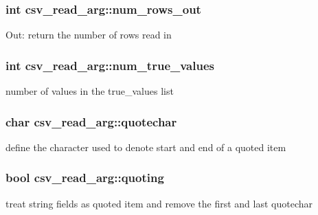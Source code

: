 \subsubsection[{\texorpdfstring{num\+\_\+rows\+\_\+out}{num_rows_out}}]{\setlength{\rightskip}{0pt plus 5cm}int csv\+\_\+read\+\_\+arg\+::num\+\_\+rows\+\_\+out}\hypertarget{structcsv__read__arg_a0ee2696a9496af7b763950450d97004c}{}\label{structcsv__read__arg_a0ee2696a9496af7b763950450d97004c}
Out\+: return the number of rows read in 
\subsubsection[{\texorpdfstring{num\+\_\+true\+\_\+values}{num_true_values}}]{\setlength{\rightskip}{0pt plus 5cm}int csv\+\_\+read\+\_\+arg\+::num\+\_\+true\+\_\+values}\hypertarget{structcsv__read__arg_addec99ef63c487be0b0cad3ea7f23c20}{}\label{structcsv__read__arg_addec99ef63c487be0b0cad3ea7f23c20}
number of values in the true\+\_\+values list 
\subsubsection[{\texorpdfstring{quotechar}{quotechar}}]{\setlength{\rightskip}{0pt plus 5cm}char csv\+\_\+read\+\_\+arg\+::quotechar}\hypertarget{structcsv__read__arg_abb368471693adcc68ce5476d9b0dfad5}{}\label{structcsv__read__arg_abb368471693adcc68ce5476d9b0dfad5}
define the character used to denote start and end of a quoted item 
\subsubsection[{\texorpdfstring{quoting}{quoting}}]{\setlength{\rightskip}{0pt plus 5cm}bool csv\+\_\+read\+\_\+arg\+::quoting}\hypertarget{structcsv__read__arg_a98f0355905fb5f65ec34440ae492b454}{}\label{structcsv__read__arg_a98f0355905fb5f65ec34440ae492b454}
treat string fields as quoted item and remove the first and last quotechar 
